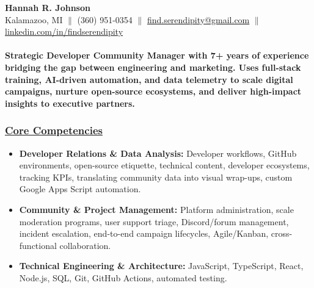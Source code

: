 \documentclass[a4paper,10pt]{article}
\begin{document}
\begin{center}
      {\LARGE \textbf{Hannah R. Johnson}} \\
      Kalamazoo, MI {$\parallel$} (360) 951-0354 {$\parallel$} \href{mailto:find.serendipity@gmail.com}{find.serendipity@gmail.com} {$\parallel$} \href{https://www.linkedin.com/in/findserendipity/}{linkedin.com/in/findserendipity}
\end{center}

\paragraph{Strategic Developer Community Manager with 7+ years of experience bridging the gap between engineering and marketing. Uses full-stack training, AI-driven automation, and data telemetry to scale digital campaigns, nurture open-source ecosystems, and deliver high-impact insights to executive partners.}

\subsubsection{\underline{Core Competencies}}

\begin{itemize}
    \item \textbf{Developer Relations \& Data Analysis:} Developer workflows, GitHub environments, open-source etiquette, technical content, developer ecosystems, tracking KPIs, translating community data into visual wrap-ups, custom Google Apps Script automation.
    \item \textbf{Community \& Project Management:} Platform administration, scale moderation programs, user support triage, Discord/forum management, incident escalation, end-to-end campaign lifecycles, Agile/Kanban, cross-functional collaboration.
    \item \textbf{Technical Engineering \& Architecture:} JavaScript, TypeScript, React, Node.js, SQL, Git, GitHub Actions, automated testing.
\end{itemize}
\end{document}
